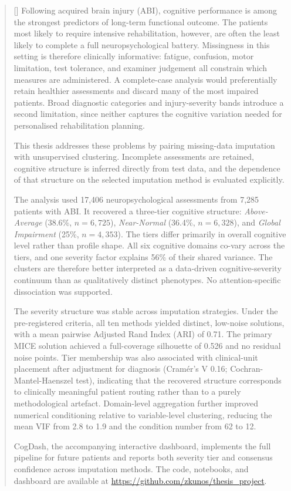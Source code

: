 \documentclass[
11pt, %
english, %
onehalfspacing, %
headsepline, %
]{MastersDoctoralThesis} %
\begin{document}

\begin{abstract}[]
\addchaptertocentry{\abstractname}
Following acquired brain injury (ABI), cognitive performance is among the strongest predictors of long-term functional outcome. The patients most likely to require intensive rehabilitation, however, are often the least likely to complete a full neuropsychological battery. Missingness in this setting is therefore clinically informative: fatigue, confusion, motor limitation, test tolerance, and examiner judgement all constrain which measures are administered. A complete-case analysis would preferentially retain healthier assessments and discard many of the most impaired patients. Broad diagnostic categories and injury-severity bands introduce a second limitation, since neither captures the cognitive variation needed for personalised rehabilitation planning.

This thesis addresses these problems by pairing missing-data imputation with unsupervised clustering. Incomplete assessments are retained, cognitive structure is inferred directly from test data, and the dependence of that structure on the selected imputation method is evaluated explicitly.

The analysis used 17,406 neuropsychological assessments from 7,285 patients with ABI. It recovered a three-tier cognitive structure: \emph{Above-Average} (38.6\%, $n = 6{,}725$), \emph{Near-Normal} (36.4\%, $n = 6{,}328$), and \emph{Global Impairment} (25\%, $n = 4{,}353$). The tiers differ primarily in overall cognitive level rather than profile shape. All six cognitive domains co-vary across the tiers, and one severity factor explains 56\% of their shared variance. The clusters are therefore better interpreted as a data-driven cognitive-severity continuum than as qualitatively distinct phenotypes. No attention-specific dissociation was supported.

The severity structure was stable across imputation strategies. Under the pre-registered criteria, all ten methods yielded distinct, low-noise solutions, with a mean pairwise Adjusted Rand Index (ARI) of 0.71. The primary MICE solution achieved a full-coverage silhouette of 0.526 and no residual noise points. Tier membership was also associated with clinical-unit placement after adjustment for diagnosis (Cram\'{e}r's V 0.16; Cochran-Mantel-Haenszel test), indicating that the recovered structure corresponds to clinically meaningful patient routing rather than to a purely methodological artefact. Domain-level aggregation further improved numerical conditioning relative to variable-level clustering, reducing the mean VIF from 2.8 to 1.9 and the condition number from 62 to 12.

CogDash, the accompanying interactive dashboard, implements the full pipeline for future patients and reports both severity tier and consensus confidence across imputation methods. The code, notebooks, and dashboard are available at \url{https://github.com/zkunos/thesis_project}.
\end{abstract}
\end{document}
